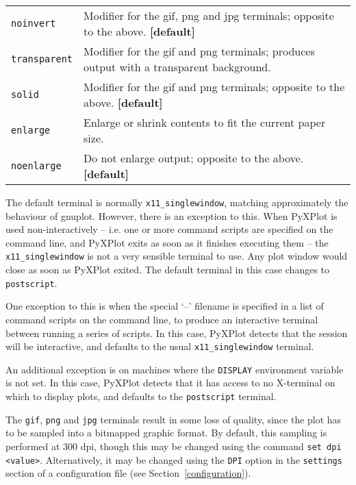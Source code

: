 \documentclass[a4paper,onecolumn,11pt]{book}
\begin{document}
\begin{longtable}{p{3cm}p{9cm}}
\texttt{noinvert} & Modifier for the gif, png and jpg terminals; opposite to the above. \textbf{[default]}\\
\texttt{transparent} & Modifier for the gif and png terminals; produces output with a transparent background.\index{transparent terminal}\index{gif output!transparency}\index{png output!transparency}\\
\texttt{solid} & Modifier for the gif and png terminals; opposite to the above. \textbf{[default]}\\
\texttt{enlarge} & Enlarge or shrink contents to fit the current paper
size.\index{enlarging output}\\
\texttt{noenlarge} & Do not enlarge output; opposite to the above. \textbf{[default]}\\
\end{longtable}
\label{terminals}

The default terminal is normally \texttt{x11\_singlewindow}, matching
approximately the behaviour of gnuplot. However, there is an exception to this.
When PyXPlot is used non-interactively -- i.e. one or more command scripts are
specified on the command line, and PyXPlot exits as soon as it finishes
executing them -- the \texttt{x11\_singlewindow} is not a very sensible
terminal to use. Any plot window would close as soon as PyXPlot exited. The
default terminal in this case changes to \texttt{postscript}.

One exception to this is when the special `--' filename is specified in a list
of command scripts on the command line, to produce an interactive terminal
between running a series of scripts. In this case, PyXPlot detects that the
session will be interactive, and defaults to the usual
\texttt{x11\_singlewindow} terminal.

An additional exception is on machines where the \texttt{DISPLAY} environment
variable is not set. In this case, PyXPlot detects that it has access to no
X-terminal on which to display plots, and defaults to the \texttt{postscript}
terminal.

The \texttt{gif}, \texttt{png} and \texttt{jpg} terminals result in some loss
of quality, since the plot has to be sampled into a bitmapped graphic format.
By default, this sampling is performed at 300 dpi, though this may be changed
using the command \texttt{set dpi <value>}. Alternatively, it may be changed
using the \texttt{DPI} option in the \texttt{settings} section of a
configuration file (see Section~\ref{configuration}).
\end{document}
